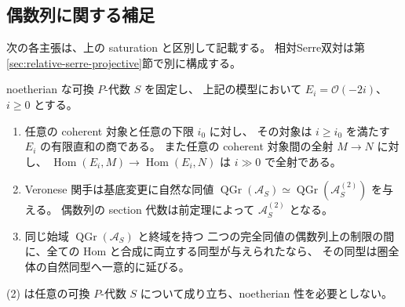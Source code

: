 \subsection{偶数列に関する補足}

次の各主張は、上の saturation と区別して記載する。
相対Serre双対は第\ref{sec:relative-serre-projective}節で別に構成する。

\begin{proposition}
\label{prop:central-model-even-sequence}
noetherian な可換 $P$-代数 $S$ を固定し、
上記の模型において $E_i=\mathcal O(-2i)$、$i\geq0$ とする。
\begin{enumerate}
 \item 任意の coherent 対象と任意の下限 $i_0$ に対し、
 その対象は $i\geq i_0$ を満たす $E_i$ の有限直和の商である。
 また任意の coherent 対象間の全射 $M\to N$ に対し、
 $\operatorname{Hom}(E_i,M)\to\operatorname{Hom}(E_i,N)$ は $i\gg0$ で全射である。
 \item Veronese 関手は基底変更に自然な同値
 $\operatorname{QGr}(\mathcal A_S)\simeq\operatorname{QGr}(\mathcal A_S^{(2)})$ を与える。
 偶数列の section 代数は前定理によって $\mathcal A_S^{(2)}$ となる。
 \item 同じ始域 $\operatorname{QGr}(\mathcal A_S)$ と終域を持つ
 二つの完全同値の偶数列上の制限の間に、全ての Hom と合成に両立する同型が与えられたなら、
 その同型は圏全体の自然同型へ一意的に延びる。
\end{enumerate}
(2) は任意の可換 $P$-代数 $S$ について成り立ち、noetherian 性を必要としない。
\end{proposition}

